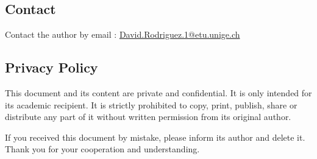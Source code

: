 \documentclass[11pt]{article}
\begin{document}
\subsection{Contact}

Contact the author by email : \href{mailto:David.Rodriguez.1@etu.unige.ch}{David.Rodriguez.1@etu.unige.ch}

\subsection{Privacy Policy}
\label{sec:privacypolice}

This document and its content are private and confidential. It is only intended for its academic recipient. It is strictly prohibited to copy, print, publish, share or distribute any part of it without written permission from its original author.

If you received this document by mistake, please inform its author and delete it. Thank you for your cooperation and understanding.
\end{document}

